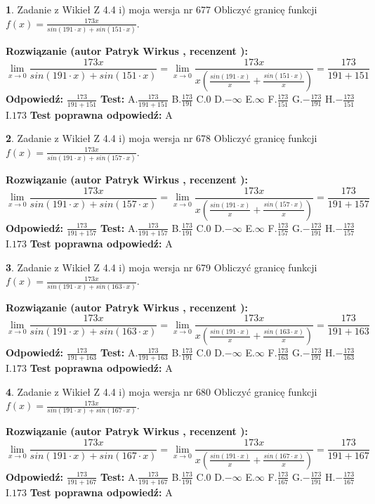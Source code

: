 \documentclass[12pt, a4paper]{article}
\theoremstyle{definition} %
\newtheorem{zad}{}
\newcommand{\zadStart}[1]{\begin{zad}#1\newline}
\newcommand{\zadStop}{\end{zad}}
\newcommand{\rozwStart}[2]{\noindent \textbf{Rozwiązanie (autor #1 , recenzent #2): }\newline}
\newcommand{\rozwStop}{\newline}
\newcommand{\odpStart}{\noindent \textbf{Odpowiedź:}\newline}
\newcommand{\odpStop}{\newline}
\newcommand{\testStart}{\noindent \textbf{Test:}\newline}
\newcommand{\testStop}{\newline}
\newcommand{\kluczStart}{\noindent \textbf{Test poprawna odpowiedź:}\newline}
\newcommand{\kluczStop}{\newline}
\begin{document}
\zadStart{Zadanie z Wikieł Z 4.4 i) moja wersja nr 677}
Obliczyć granicę funkcji $f(x)=\frac{173x}{sin(191\cdot x) +sin(151\cdot x)}$.
\zadStop
\rozwStart{Patryk Wirkus}{}
$$\lim\limits_{x\to 0}\frac{173x}{sin(191\cdot x) +sin(151\cdot x)}=\lim\limits_{x\to 0}\frac{173x}{x(\frac{sin(191\cdot x)}{x}+\frac{sin(151\cdot x)}{x})}=\frac{173}{191+151}$$
\rozwStop
\odpStart
$\frac{173}{191+151}$
\odpStop
\testStart
A.$\frac{173}{191+151}$
B.$\frac{173}{191}$
C.$0$
D.$-\infty$
E.$\infty$
F.$\frac{173}{151}$
G.$-\frac{173}{191}$
H.$-\frac{173}{151}$
I.$173$
\testStop
\kluczStart
A
\kluczStop



\zadStart{Zadanie z Wikieł Z 4.4 i) moja wersja nr 678}
Obliczyć granicę funkcji $f(x)=\frac{173x}{sin(191\cdot x) +sin(157\cdot x)}$.
\zadStop
\rozwStart{Patryk Wirkus}{}
$$\lim\limits_{x\to 0}\frac{173x}{sin(191\cdot x) +sin(157\cdot x)}=\lim\limits_{x\to 0}\frac{173x}{x(\frac{sin(191\cdot x)}{x}+\frac{sin(157\cdot x)}{x})}=\frac{173}{191+157}$$
\rozwStop
\odpStart
$\frac{173}{191+157}$
\odpStop
\testStart
A.$\frac{173}{191+157}$
B.$\frac{173}{191}$
C.$0$
D.$-\infty$
E.$\infty$
F.$\frac{173}{157}$
G.$-\frac{173}{191}$
H.$-\frac{173}{157}$
I.$173$
\testStop
\kluczStart
A
\kluczStop



\zadStart{Zadanie z Wikieł Z 4.4 i) moja wersja nr 679}
Obliczyć granicę funkcji $f(x)=\frac{173x}{sin(191\cdot x) +sin(163\cdot x)}$.
\zadStop
\rozwStart{Patryk Wirkus}{}
$$\lim\limits_{x\to 0}\frac{173x}{sin(191\cdot x) +sin(163\cdot x)}=\lim\limits_{x\to 0}\frac{173x}{x(\frac{sin(191\cdot x)}{x}+\frac{sin(163\cdot x)}{x})}=\frac{173}{191+163}$$
\rozwStop
\odpStart
$\frac{173}{191+163}$
\odpStop
\testStart
A.$\frac{173}{191+163}$
B.$\frac{173}{191}$
C.$0$
D.$-\infty$
E.$\infty$
F.$\frac{173}{163}$
G.$-\frac{173}{191}$
H.$-\frac{173}{163}$
I.$173$
\testStop
\kluczStart
A
\kluczStop



\zadStart{Zadanie z Wikieł Z 4.4 i) moja wersja nr 680}
Obliczyć granicę funkcji $f(x)=\frac{173x}{sin(191\cdot x) +sin(167\cdot x)}$.
\zadStop
\rozwStart{Patryk Wirkus}{}
$$\lim\limits_{x\to 0}\frac{173x}{sin(191\cdot x) +sin(167\cdot x)}=\lim\limits_{x\to 0}\frac{173x}{x(\frac{sin(191\cdot x)}{x}+\frac{sin(167\cdot x)}{x})}=\frac{173}{191+167}$$
\rozwStop
\odpStart
$\frac{173}{191+167}$
\odpStop
\testStart
A.$\frac{173}{191+167}$
B.$\frac{173}{191}$
C.$0$
D.$-\infty$
E.$\infty$
F.$\frac{173}{167}$
G.$-\frac{173}{191}$
H.$-\frac{173}{167}$
I.$173$
\testStop
\kluczStart
A
\kluczStop
\end{document}
